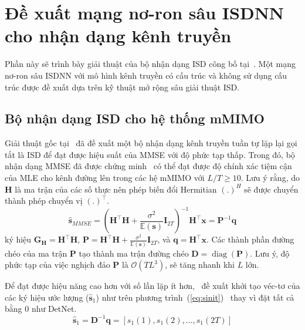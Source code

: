 \section{Đề xuất mạng nơ-ron sâu ISDNN cho nhận dạng kênh truyền}

Phần này sẽ trình bày giải thuật của bộ nhận dạng ISD công bố tại~\cite{Mandloi2017}. Một mạng nơ-ron sâu ISDNN với mô hình kênh truyền có cấu trúc và không sử dụng cấu trúc được đề xuất dựa trên kỹ thuật mở rộng sâu giải thuật ISD.

\subsection{Bộ nhận dạng ISD cho hệ thống mMIMO}

Giải thuật gốc tại~\cite{Mandloi2017} đã đề xuất một bộ nhận dạng kênh truyền tuần tự lặp lại gọi tắt là ISD để đạt được hiệu suất của MMSE với độ phức tạp thấp. Trong đó, bộ nhận dạng MMSE đã được chứng minh~\cite{Rusek2013} có thể đạt được độ chính xác tiệm cận của MLE cho kênh đường lên trong các hệ mMIMO với $L/T \ge 10$. Lưu ý rằng, do $\mathbf{H}$ là ma trận của các số thực nên phép biến đổi Hermitian $(.)^H$ sẽ được chuyển thành phép chuyển vị $(.)^\top$.
\begin{equation}
    \hat{\mathbf{s}}_{MMSE}=\left(\mathbf{H}^\top \mathbf{H}+\frac{\sigma^2}{\mathbb{E}(\mathbf{s})} \mathbf{I}_{2T}\right)^{-1} \mathbf{H}^\top \mathbf{x}=\mathbf{P}^{-1} \mathbf{q}
\end{equation}
ký hiệu $\mathbf{G}_\mathbf{H} = \mathbf{H}^\top \mathbf{H}$, $\mathbf{P} = \mathbf{H}^\top \mathbf{H}+\frac{\sigma^2}{\mathbb{E}(\mathbf{s})} \mathbf{I}_{2T}$, và $\mathbf{q} = \mathbf{H}^\top \mathbf{x}$. 
Các thành phần đường chéo của ma trận $\mathbf{P}$ tạo thành ma trận đường chéo $\mathbf{D} = \operatorname{diag}(\mathbf{P})$.
Lưu ý, độ phức tạp của việc nghịch đảo $\mathbf{P}$ là $\mathcal{O}(TL^3)$, sẽ tăng nhanh khi $L$ lớn. 

Để đạt được hiệu năng cao hơn với số lần lặp ít hơn,~\cite{Mandloi2017} đề xuất khởi tạo véc-tơ của các ký hiệu ước lượng ($\hat{\mathbf{s}}_1$) như trên phương trình~(\ref{eq:sinit})~\cite{Gao2014} thay vì đặt tất cả bằng $0$ như DetNet.
\begin{equation}
\label{eq:sinit}
    \hat{\mathbf{s}}_1=\mathbf{D}^{-1} \mathbf{q}=\left[s_1(1), s_1(2), \ldots, s_1(2T)\right]
\end{equation}

